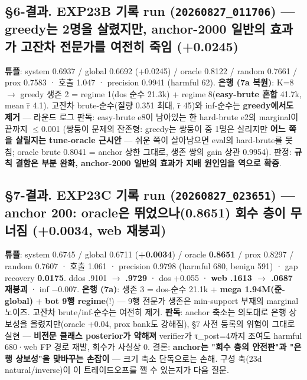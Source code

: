 \subsection{§6-결과. EXP23B 기록 run (\texttt{20260827\allowbreak{}\_\allowbreak{}\allowbreak{}011706}) — greedy는 2명을 살렸지만, anchor-2000 일반의 효과가 고잔차 전문가를 여전히 죽임 (+\allowbreak{}0.0245)}
\textbf{튜플}: system 0.6937 /\allowbreak{} global 0.6692 (+\allowbreak{}0.0245) /\allowbreak{} oracle 0.8122 /\allowbreak{} random 0.7661 /\allowbreak{} prox 0.7583 · 호출 1.047 · precision 0.9941 (harmful 62). \textbf{은행 (7a 복원)}: K=\allowbreak{}8  \ensuremath{\rightarrow}  greedy 생존 2 =\allowbreak{} regime 1(dos 순수 21.3k) +\allowbreak{} regime 8(\textbf{easy-brute 혼합} 41.7k, mean r̄ 4.1). 고잔차 brute-순수(질량 0.351 최대, r̄ 45)와 inf-순수는 \textbf{greedy에서도 제거} — 라운드 로그 판독: easy-brute e8이 남아있는 한 hard-brute e2의 marginal이 끝까지 \ensuremath{\leq}0.001 (쌍둥이 문제의 잔존형: greedy는 쌍둥이 중 1명은 살리지만 \textbf{어느 쪽을 살릴지는 tune-oracle 근시안} — 쉬운 쪽이 살아남으면 eval의 hard-brute를 못 침; oracle brute 0.8041 =\allowbreak{} anchor 상한 그대로, 생존 쌍의 gain 상관 0.9954). 판정: \textbf{규칙 결함은 부분 완화, anchor-2000 일반의 효과가 지배 원인임을 역으로 확증}.

\subsection{§7-결과. EXP23C 기록 run (\texttt{20260827\allowbreak{}\_\allowbreak{}\allowbreak{}023651}) — anchor 200: oracle은 뛰었으나(0.8651) 회수 층이 무너짐 (+\allowbreak{}0.0034, web 재붕괴)}
\textbf{튜플}: system 0.6745 /\allowbreak{} global 0.6711 (\textbf{+\allowbreak{}0.0034}) /\allowbreak{} oracle \textbf{0.8651} /\allowbreak{} prox 0.8297 /\allowbreak{} random 0.7607 · 호출 1.061 · precision 0.9798 (harmful 680, benign 591) · gap recovery \textbf{0.0175}. ddos .9101 \ensuremath{\rightarrow} \textbf{.9729} · dos +\allowbreak{}0.055 · \textbf{web .1613 \ensuremath{\rightarrow} .0687 재붕괴} · inf −0.007. \textbf{은행 (7a)}: 생존 3 =\allowbreak{} dos-순수 21.1k +\allowbreak{} \textbf{mega 1.94M(준-global)} +\allowbreak{} \textbf{bot 9행 regime}(!) — 9행 전문가 생존은 min-support 부재의 marginal 노이즈. 고잔차 brute/\allowbreak{}inf-순수는 여전히 제거. \textbf{판독}: anchor 축소는 의도대로 은행 상보성을 올렸지만(oracle +\allowbreak{}0.04, prox bank도 강해짐), §7 사전 등록의 위험이 그대로 실현 — \textbf{비전문 클래스 posterior가 약해져} verifier가 τ\_\allowbreak{}post=\allowbreak{}4까지 조여도 harmful 680·web FP 경로 재발, 회수가 사실상 0. 결론: \textbf{anchor는 "회수 층의 안전판"과 "은행 상보성"을 맞바꾸는 손잡이} — 크기 축소 단독으로는 손해. 구성 축(23d natural/\allowbreak{}inverse)이 이 트레이드오프를 깰 수 있는지가 다음 질문.

